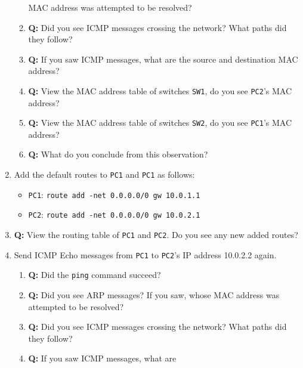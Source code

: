 \documentclass[pdftex,12pt,a4paper]{article}
\begin{document}
\begin{enumerate}
\begin{enumerate}
                            MAC address was attempted to be resolved?
                        \item \textbf{Q:} Did you see ICMP messages crossing the
                            network? What paths did they follow?
                        \item \textbf{Q:} If you saw ICMP messages, what are
                            the source and destination MAC address?
                        \item \textbf{Q:} View the MAC address table of
                            switches \texttt{SW1}, do you see \texttt{PC2}'s MAC address?
                        \item \textbf{Q:} View the MAC address table of
                            switches \texttt{SW2}, do you see \texttt{PC1}'s MAC address?
                        \item \textbf{Q:} What do you conclude from this observation?
                    \end{enumerate}
                \item Add the default routes to \texttt{PC1} and \texttt{PC1} as follows:
                    \begin{itemize}
                        \item \texttt{PC1}: \texttt{route add -net 0.0.0.0/0 gw
                            10.0.1.1}
                        \item \texttt{PC2}: \texttt{route add -net 0.0.0.0/0 gw
                            10.0.2.1}
                    \end{itemize}
                \item \textbf{Q:} View the routing table of \texttt{PC1} and
                    \texttt{PC2}. Do
                    you see any new added routes?
                \item Send ICMP Echo messages from \texttt{PC1} to \texttt{PC2}'s IP address
                    10.0.2.2 again.
                    \begin{enumerate}
                        \item \textbf{Q:} Did the \texttt{ping} command succeed?
                        \item \textbf{Q:} Did you see ARP messages? If you saw, whose
                            MAC address was attempted to be resolved?
                        \item \textbf{Q:} Did you see ICMP messages crossing the
                            network? What paths did they follow?
                        \item \textbf{Q:} If you saw ICMP messages, what are

\end{enumerate}
\end{enumerate}
\end{document}
